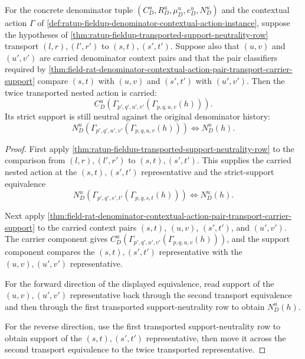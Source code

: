 \begin{theorem}
\label{thm:ratup-fieldup-iterated-transported-support-neutrality-row}
For the concrete denominator tuple $(C_D^u,R_D^u,\mu_D^u,e_D^u,N_D^u)$ and the
contextual action $\Gamma$ of
\autoref{def:ratup-fieldup-denominator-contextual-action-instance}, suppose the
hypotheses of
\autoref{thm:ratup-fieldup-transported-support-neutrality-row} transport
$(l,r),(l',r')$ to $(s,t),(s',t')$. Suppose also that $(u,v)$ and $(u',v')$ are
carried denominator context pairs and that the pair classifiers required by
\autoref{thm:field-rat-denominator-contextual-action-pair-transport-carrier-support}
compare $(s,t)$ with $(u,v)$ and $(s',t')$ with $(u',v')$. Then the twice
transported nested action is carried:
$$
C_D^u(\Gamma_{p',q',u',v'}(\Gamma_{p,q,u,v}(h))).
$$
Its strict support is still neutral against the original denominator history:
$$
N_D^u(\Gamma_{p',q',u',v'}(\Gamma_{p,q,u,v}(h)))
\Longleftrightarrow N_D^u(h).
$$
\end{theorem}
\begin{proof}
First apply
\autoref{thm:ratup-fieldup-transported-support-neutrality-row} to the comparison
from $(l,r),(l',r')$ to $(s,t),(s',t')$. This supplies the carried nested action
at the $(s,t),(s',t')$ representative and the strict-support equivalence
$$
N_D^u(\Gamma_{p',q',s',t'}(\Gamma_{p,q,s,t}(h)))
\Longleftrightarrow N_D^u(h).
$$

Next apply
\autoref{thm:field-rat-denominator-contextual-action-pair-transport-carrier-support}
to the carried context pairs $(s,t)$, $(u,v)$, $(s',t')$, and $(u',v')$. The
carrier component gives
$C_D^u(\Gamma_{p',q',u',v'}(\Gamma_{p,q,u,v}(h)))$, and the support component
compares the $(s,t),(s',t')$ representative with the $(u,v),(u',v')$
representative.

For the forward direction of the displayed equivalence, read support of the
$(u,v),(u',v')$ representative back through the second transport equivalence and
then through the first transported support-neutrality row to obtain $N_D^u(h)$.

For the reverse direction, use the first transported support-neutrality row to
obtain support of the $(s,t),(s',t')$ representative, then move it across the
second transport equivalence to the twice transported representative.
\end{proof}

